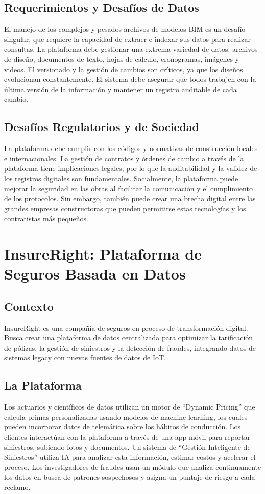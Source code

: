 \documentclass[12pt]{article}
\begin{document}
\subsection{Requerimientos y Desafíos de Datos}
El manejo de los complejos y pesados archivos de modelos BIM es un desafío singular, que requiere la capacidad de extraer e indexar sus datos para realizar consultas. La plataforma debe gestionar una extrema variedad de datos: archivos de diseño, documentos de texto, hojas de cálculo, cronogramas, imágenes y videos. El versionado y la gestión de cambios son críticos, ya que los diseños evolucionan constantemente. El sistema debe asegurar que todos trabajen con la última versión de la información y mantener un registro auditable de cada cambio.

\subsection{Desafíos Regulatorios y de Sociedad}
La plataforma debe cumplir con los códigos y normativas de construcción locales e internacionales. La gestión de contratos y órdenes de cambio a través de la plataforma tiene implicaciones legales, por lo que la auditabilidad y la validez de los registros digitales son fundamentales. Socialmente, la plataforma puede mejorar la seguridad en las obras al facilitar la comunicación y el cumplimiento de los protocolos. Sin embargo, también puede crear una brecha digital entre las grandes empresas constructoras que pueden permitirse estas tecnologías y los contratistas más pequeños.

\newpage

\section{InsureRight: Plataforma de Seguros Basada en Datos}

\subsection{Contexto}
InsureRight es una compañía de seguros en proceso de transformación digital. Busca crear una plataforma de datos centralizada para optimizar la tarificación de pólizas, la gestión de siniestros y la detección de fraudes, integrando datos de sistemas legacy con nuevas fuentes de datos de IoT.

\subsection{La Plataforma}
Los actuarios y científicos de datos utilizan un motor de ``Dynamic Pricing'' que calcula primas personalizadas usando modelos de machine learning, los cuales pueden incorporar datos de telemática sobre los hábitos de conducción. Los clientes interactúan con la plataforma a través de una app móvil para reportar siniestros, subiendo fotos y documentos. Un sistema de ``Gestión Inteligente de Siniestros'' utiliza IA para analizar esta información, estimar costos y acelerar el proceso. Los investigadores de fraudes usan un módulo que analiza continuamente los datos en busca de patrones sospechosos y asigna un puntaje de riesgo a cada reclamo.
\end{document}
